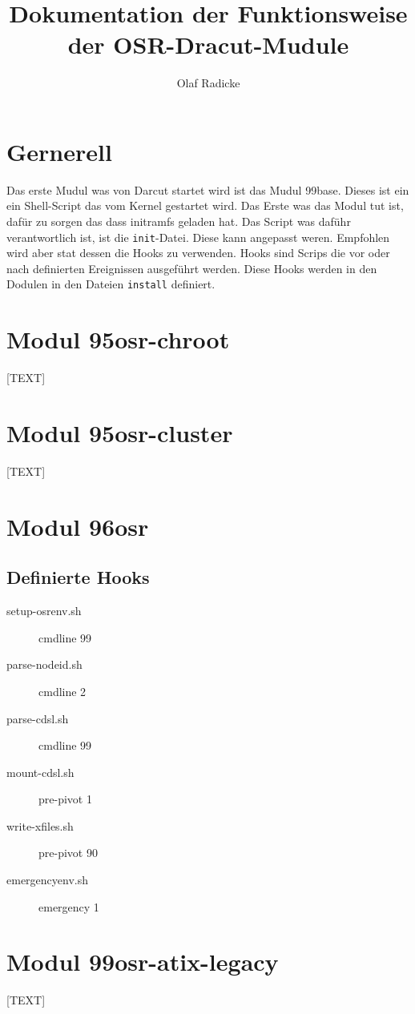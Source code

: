 \documentclass[10pt,a4paper,titlepage]{article}
\author{Olaf Radicke}
\title{Dokumentation der Funktionsweise der OSR-Dracut-Mudule}
\begin{document}
\maketitle

\newpage 

\tableofcontents

\newpage 

\section{Gernerell}

Das erste Mudul was von Darcut startet wird ist das Mudul 99base. Dieses ist ein ein Shell-Script das vom Kernel gestartet wird. Das Erste was das Modul tut ist, dafür zu sorgen das dass initramfs geladen hat. Das Script was daführ verantwortlich ist, ist die \texttt{init}-Datei. Diese kann angepasst weren. Empfohlen wird aber stat dessen die Hooks zu verwenden. Hooks sind Scrips die vor oder nach definierten Ereignissen ausgeführt werden. Diese Hooks werden in den Dodulen in den Dateien \texttt{install} definiert. 

\section{Modul 95osr-chroot}

[TEXT]

\section{Modul 95osr-cluster}

[TEXT]

\section{Modul 96osr}

\subsection{Definierte Hooks}


\begin{description}
\item[setup-osrenv.sh] cmdline  99
\item[parse-nodeid.sh] cmdline  2
\item[parse-cdsl.sh] cmdline 99
\item[mount-cdsl.sh] pre-pivot 1
\item[write-xfiles.sh] pre-pivot 90
\item[emergencyenv.sh] emergency 1
\end{description}




\section{Modul 99osr-atix-legacy}

[TEXT]
\end{document}

